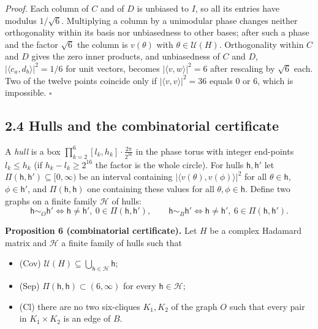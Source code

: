 \documentclass[
  11pt,
]{article}
\providecommand{\tightlist}{%
  \setlength{\itemsep}{0pt}\setlength{\parskip}{0pt}}
\begin{document}
\emph{Proof.} Each column of \(C\) and of \(D\) is unbiased to \(I\), so
all its entries have modulus \(1/\sqrt6\). Multiplying a column by a
unimodular phase changes neither orthogonality within its basis nor
unbiasedness to other bases; after such a phase and the factor
\(\sqrt6\) the column is \(v(\theta)\) with \(\theta\in\mathcal U(H)\).
Orthogonality within \(C\) and \(D\) gives the zero inner products, and
unbiasedness of \(C\) and \(D\), \(|\langle c_a,d_b\rangle|^2=1/6\) for
unit vectors, becomes \(|\langle v,w\rangle|^2=6\) after rescaling by
\(\sqrt6\) each. Two of the twelve points coincide only if
\(|\langle v,v\rangle|^2=36\) equals \(0\) or \(6\), which is
impossible. \(\square\)

\subsection{2.4 Hulls and the combinatorial
certificate}\label{hulls-and-the-combinatorial-certificate}

A \emph{hull} is a box
\(\prod_{k=2}^{6}[l_k,h_k]\cdot\frac{2\pi}{2^{16}}\) in the phase torus
with integer end-points \(l_k\le h_k\) (if \(h_k-l_k\ge2^{16}\) the
factor is the whole circle). For hulls \(\mathsf h,\mathsf h'\) let
\(\Pi(\mathsf h,\mathsf h')\subseteq[0,\infty)\) be an interval
containing \(|\langle v(\theta),v(\phi)\rangle|^2\) for all
\(\theta\in\mathsf h\), \(\phi\in\mathsf h'\), and
\(\Pi(\mathsf h,\mathsf h)\) one containing these values for all
\(\theta,\phi\in\mathsf h\). Define two graphs on a finite family
\(\mathcal H\) of hulls: \[
\mathsf h\sim_O\mathsf h'\iff \mathsf h\ne\mathsf h',\ 0\in\Pi(\mathsf h,\mathsf h'),\qquad \mathsf h\sim_B\mathsf h'\iff \mathsf h\ne\mathsf h',\ 6\in\Pi(\mathsf h,\mathsf h').
\]

\textbf{Proposition 6 (combinatorial certificate).} Let \(H\) be a
complex Hadamard matrix and \(\mathcal H\) a finite family of hulls such
that

\begin{itemize}
\tightlist
\item
  (Cov)
  \(\mathcal U(H)\subseteq\bigcup_{\mathsf h\in\mathcal H}\mathsf h\);
\item
  (Sep) \(\Pi(\mathsf h,\mathsf h)\subset(6,\infty)\) for every
  \(\mathsf h\in\mathcal H\);
\item
  (Cl) there are no two six-cliques \(K_1,K_2\) of the graph \(O\) such
  that every pair in \(K_1\times K_2\) is an edge of \(B\).
\end{itemize}
\end{document}
